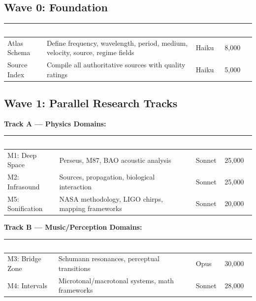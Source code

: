 \documentclass[11pt,letterpaper]{article}
\newcommand{\tableheader}[1]{\textbf{\sffamily\textcolor{white}{#1}}}
\begin{document}
\subsection{Wave 0: Foundation}

\begin{center}
\begin{tabularx}{\textwidth}{L{3.5cm}XC{1.5cm}C{2cm}}
\toprule
{}
\tableheader{Task} & \tableheader{Description} & \tableheader{Model} & \tableheader{Tokens} \\
\midrule
Atlas Schema & Define frequency, wavelength, period, medium, velocity, source, regime fields & Haiku & 8,000 \\
Source Index & Compile all authoritative sources with quality ratings & Haiku & 5,000 \\
\bottomrule
\end{tabularx}
\end{center}

\subsection{Wave 1: Parallel Research Tracks}

\textbf{Track A --- Physics Domains:}

\begin{center}
\begin{tabularx}{\textwidth}{L{3.5cm}XC{1.5cm}C{2cm}}
\toprule
{}
\tableheader{Task} & \tableheader{Description} & \tableheader{Model} & \tableheader{Tokens} \\
\midrule
M1: Deep Space & Perseus, M87, BAO acoustic analysis & Sonnet & 25,000 \\
M2: Infrasound & Sources, propagation, biological interaction & Sonnet & 25,000 \\
M5: Sonification & NASA methodology, LIGO chirps, mapping frameworks & Sonnet & 20,000 \\
\bottomrule
\end{tabularx}
\end{center}

\textbf{Track B --- Music/Perception Domains:}

\begin{center}
\begin{tabularx}{\textwidth}{L{3.5cm}XC{1.5cm}C{2cm}}
\toprule
{}
\tableheader{Task} & \tableheader{Description} & \tableheader{Model} & \tableheader{Tokens} \\
\midrule
M3: Bridge Zone & Schumann resonances, perceptual transitions & Opus & 30,000 \\
M4: Intervals & Microtonal/macrotonal systems, math frameworks & Sonnet & 28,000 \\
\bottomrule
\end{tabularx}
\end{center}
\end{document}
